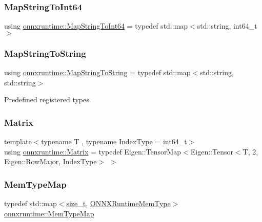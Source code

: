 \subsubsection{\texorpdfstring{Map\+String\+To\+Int64}{MapStringToInt64}}
{\footnotesize\ttfamily using \mbox{\hyperlink{namespaceonnxruntime_a8333bda111400cb767f9faa6f862f560}{onnxruntime\+::\+Map\+String\+To\+Int64}} = typedef std\+::map$<$std\+::string, int64\+\_\+t$>$}

\mbox{\label{namespaceonnxruntime_ad08e9cd3839f6134e87cee3370f5d7b3}} 
\subsubsection{\texorpdfstring{Map\+String\+To\+String}{MapStringToString}}
{\footnotesize\ttfamily using \mbox{\hyperlink{namespaceonnxruntime_ad08e9cd3839f6134e87cee3370f5d7b3}{onnxruntime\+::\+Map\+String\+To\+String}} = typedef std\+::map$<$std\+::string, std\+::string$>$}



Predefined registered types. 

\mbox{\label{namespaceonnxruntime_a5cf6121dfe1df46b79ad87327786bb2c}} 
\subsubsection{\texorpdfstring{Matrix}{Matrix}}
{\footnotesize\ttfamily template$<$typename T , typename Index\+Type  = int64\+\_\+t$>$ \\
using \mbox{\hyperlink{namespaceonnxruntime_a5cf6121dfe1df46b79ad87327786bb2c}{onnxruntime\+::\+Matrix}} = typedef Eigen\+::\+Tensor\+Map$<$Eigen\+::\+Tensor$<$T, 2, Eigen\+::\+Row\+Major, Index\+Type$>$ $>$}

\mbox{\label{namespaceonnxruntime_ad53d5ace215052258a4346ee68c2624e}} 
\subsubsection{\texorpdfstring{Mem\+Type\+Map}{MemTypeMap}}
{\footnotesize\ttfamily typedef std\+::map$<$\mbox{\hyperlink{mlasi_8h_a503efbc1c6e50825320ad909366b78ab}{size\+\_\+t}}, \mbox{\hyperlink{allocator__info_8h_add3f8ee3ff93395704abae71c30cab18}{O\+N\+N\+X\+Runtime\+Mem\+Type}}$>$ \mbox{\hyperlink{namespaceonnxruntime_ad53d5ace215052258a4346ee68c2624e}{onnxruntime\+::\+Mem\+Type\+Map}}}

